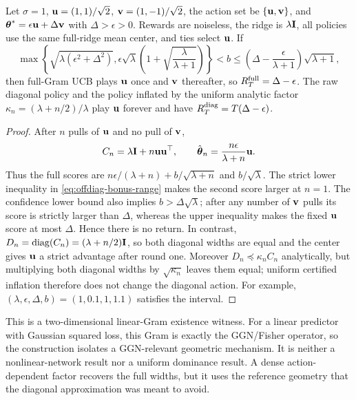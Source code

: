 \iflegacyextras
\begin{proposition}\label{prop:offdiag-witness}
Let $\sigma=1$, $\mathbf{u}=(1,1)/\sqrt2$, $\mathbf{v}=(1,-1)/\sqrt2$, the action set be
$\{\mathbf{u},\mathbf{v}\}$, and $\boldsymbol{\theta}^*=\epsilon\mathbf{u}+\Delta\mathbf{v}$ with
$\Delta>\epsilon>0$.  Rewards are noiseless, the ridge is $\lambda\mathbf{I}$, all
policies use the same full-ridge mean center, and ties select $\mathbf{u}$.  If
\begin{equation}\label{eq:offdiag-bonus-range}
\max\!\left\{\sqrt{\lambda(\epsilon^2+\Delta^2)},
 \epsilon\sqrt\lambda\!\left(1+\sqrt{\frac\lambda{\lambda+1}}\right)\right\}
 < b\le\left(\Delta-\frac\epsilon{\lambda+1}\right)\sqrt{\lambda+1},
\end{equation}
then full-Gram UCB plays $\mathbf{u}$ once and $\mathbf{v}$ thereafter, so
$R_T^{\rm full}=\Delta-\epsilon$.  The raw diagonal policy and the policy
inflated by the uniform analytic factor
$\kappa_n=(\lambda+n/2)/\lambda$ play $\mathbf{u}$ forever and have
$R_T^{\rm diag}=T(\Delta-\epsilon)$.
\end{proposition}
\begin{proof}
After $n$ pulls of $\mathbf{u}$ and no pull of $\mathbf{v}$,
\[
 C_n=\lambda\mathbf{I}+n\mathbf{u}\mathbf{u}^\top,\qquad
 \hat{\boldsymbol{\theta}}_n=\frac{n\epsilon}{\lambda+n}\mathbf{u} .
\]
Thus the full scores are
$n\epsilon/(\lambda+n)+b/\sqrt{\lambda+n}$ and $b/\sqrt\lambda$.
The strict lower inequality in \eqref{eq:offdiag-bonus-range} makes the second
score larger at $n=1$.  The confidence lower bound also implies
$b>\Delta\sqrt\lambda$; after any number of $\mathbf{v}$ pulls its score is strictly
larger than $\Delta$, whereas the upper inequality makes the fixed $\mathbf{u}$ score
at most $\Delta$.  Hence there is no return.  In contrast,
$D_n=\operatorname{diag}(C_n)=(\lambda+n/2)\mathbf{I}$, so both diagonal widths are
equal and the center gives $\mathbf{u}$ a strict advantage after round one.  Moreover
$D_n\preceq\kappa_nC_n$ analytically, but multiplying both diagonal widths by
$\sqrt{\kappa_n}$ leaves them equal; uniform certified inflation therefore does
not change the diagonal action.  For example,
$(\lambda,\epsilon,\Delta,b)=(1,0.1,1,1.1)$ satisfies the interval.
\end{proof}
This is a two-dimensional linear-Gram existence witness.  For a linear predictor
with Gaussian squared loss, this Gram is exactly the GGN/Fisher operator, so the
construction isolates a GGN-relevant geometric mechanism.  It is neither a
nonlinear-network result nor a uniform dominance result.  A dense action-dependent
factor recovers the full widths, but it uses the reference geometry that the
diagonal approximation was meant to avoid.
\fi

